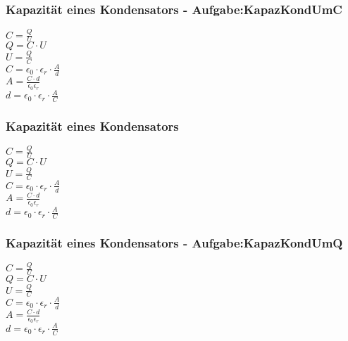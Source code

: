 \subsubsection{Kapazität eines Kondensators - Aufgabe:KapazKondUmC} 
\begin{minipage}{0.45\textwidth} 
$ C = \frac{Q}{U} $\\ 
$ Q = C\cdot U $\\ 
$ U = \frac{Q}{C} $\\ 
$ C = \epsilon _{0} \cdot \epsilon _{r} \cdot \frac{A}{d} $\\ 
$ A = \frac{C\cdot d}{\epsilon _{0} \epsilon _{r} } $\\ 
$ d = \epsilon _{0} \cdot \epsilon _{r} \cdot \frac{A}{C} $\\ 
\end{minipage} 
\begin{minipage}{0.45\textwidth} 
 
\end{minipage} 
\subsubsection{Kapazität eines Kondensators} 
\begin{minipage}{0.45\textwidth} 
$ C = \frac{Q}{U} $\\ 
$ Q = C\cdot U $\\ 
$ U = \frac{Q}{C} $\\ 
$ C = \epsilon _{0} \cdot \epsilon _{r} \cdot \frac{A}{d} $\\ 
$ A = \frac{C\cdot d}{\epsilon _{0} \epsilon _{r} } $\\ 
$ d = \epsilon _{0} \cdot \epsilon _{r} \cdot \frac{A}{C} $\\ 
\end{minipage} 
\begin{minipage}{0.45\textwidth} 
 
\end{minipage} 
\subsubsection{Kapazität eines Kondensators - Aufgabe:KapazKondUmQ} 
\begin{minipage}{0.45\textwidth} 
$ C = \frac{Q}{U} $\\ 
$ Q = C\cdot U $\\ 
$ U = \frac{Q}{C} $\\ 
$ C = \epsilon _{0} \cdot \epsilon _{r} \cdot \frac{A}{d} $\\ 
$ A = \frac{C\cdot d}{\epsilon _{0} \epsilon _{r} } $\\ 
$ d = \epsilon _{0} \cdot \epsilon _{r} \cdot \frac{A}{C} $\\ 
\end{minipage} 
\begin{minipage}{0.45\textwidth} 
 
\end{minipage} 
